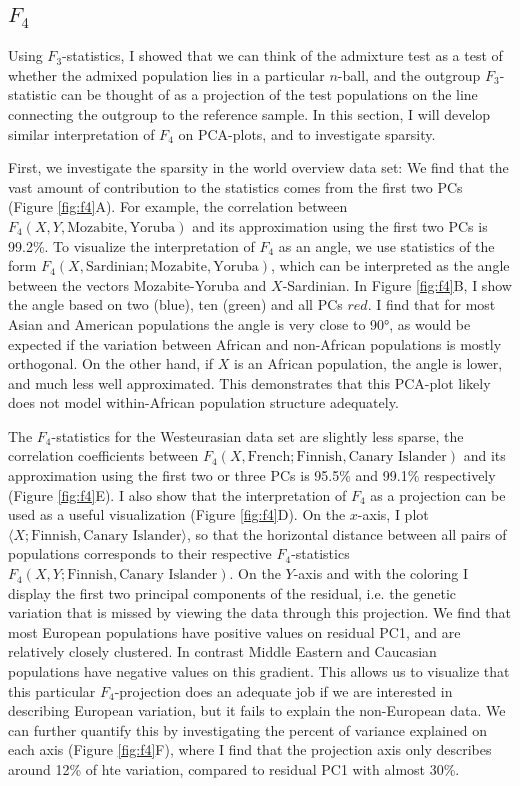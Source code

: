 \documentclass[12pt,a4pape, fullpage]{article}
\begin{document}
\subsection{$F_4$}
Using $F_3$-statistics, I showed that we can think of the admixture test as a test of whether the admixed population lies in a particular $n$-ball, and the outgroup $F_3$-statistic can be thought of as a projection of the test populations on the line connecting the outgroup to the reference sample. In this section, I will develop similar interpretation of $F_4$ on PCA-plots, and to investigate sparsity. 

First, we investigate the sparsity in the world overview data set: We find that the vast amount of contribution to the statistics comes from the first two PCs (Figure \ref{fig:f4}A). For example, the correlation between $F_4(X, Y, \text{Mozabite}, \text{Yoruba})$ and its approximation using the first two PCs is 99.2\%. To visualize the interpretation of $F_4$ as an angle, we use statistics of the form $F_4(X, \text{Sardinian}; \text{Mozabite}, \text{Yoruba})$, which can be interpreted as the angle between the vectors Mozabite-Yoruba and $X$-Sardinian. In Figure \ref{fig:f4}B, I show the angle based on two (blue), ten (green) and all PCs $red$. I find that for most Asian and American populations the angle is very close to 90°, as would be expected if the variation between African and non-African populations is mostly orthogonal. On the other hand, if $X$ is an African population, the angle is lower, and much less well approximated. This demonstrates that this PCA-plot likely does not model within-African population structure adequately. 

The $F_4$-statistics for the Westeurasian data set are slightly less sparse, the correlation coefficients between $F_4(X, \text{French}; \text{Finnish}, \text{Canary Islander})$ and its approximation using the first two or three PCs is 95.5\% and 99.1\% respectively (Figure \ref{fig:f4}E). I also show that the interpretation of $F_4$ as a projection can be used as a useful visualization (Figure \ref{fig:f4}D). On the $x$-axis, I plot $\langle X; \text{Finnish}, \text{Canary Islander}\rangle$, so that the horizontal distance between all pairs of populations corresponds to their respective $F_4$-statistics $F_4(X, Y; \text{Finnish}, \text{Canary Islander})$. On the $Y$-axis and with the coloring I display the first two principal components of the residual, i.e. the genetic variation that is missed by viewing the data through this projection. We find that most European populations have positive values on residual PC1, and are relatively closely clustered. In contrast Middle Eastern and Caucasian populations have negative values on this gradient. This allows us to visualize that this particular $F_4$-projection does an adequate job if we are interested in describing European variation, but it fails to explain the non-European data. We can further quantify this by investigating the percent of variance explained on each axis (Figure \ref{fig:f4}F), where I find that the projection axis only describes around 12\% of hte variation, compared to residual PC1 with almost 30\%.
\end{document}
